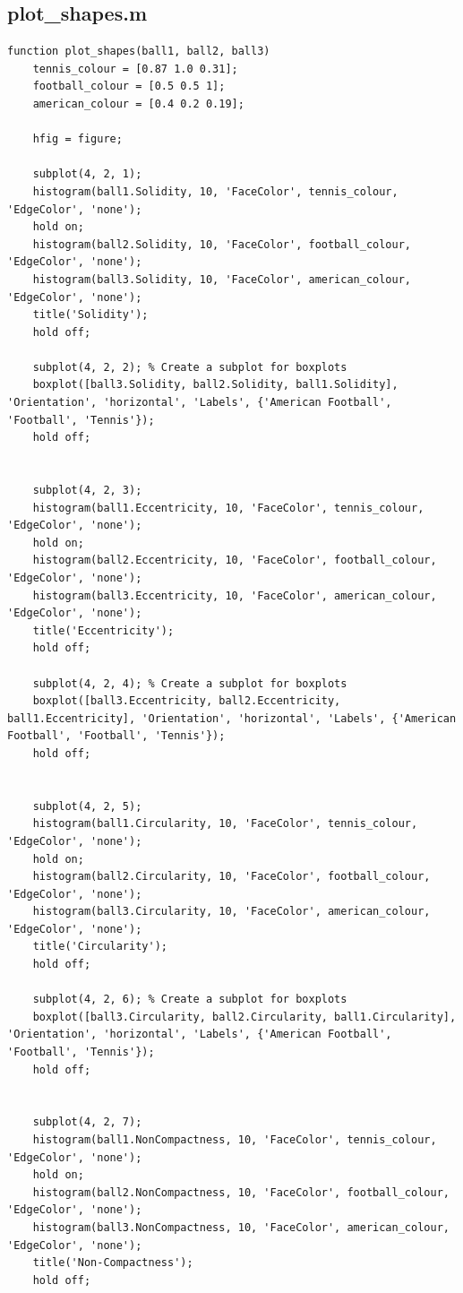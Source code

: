 \documentclass[conference]{IEEEtran}
\begin{document}
        \subsection{plot\_shapes.m}
            \begin{lstlisting}[style=Matlab-editor, basicstyle=\scriptsize]
function plot_shapes(ball1, ball2, ball3)
    tennis_colour = [0.87 1.0 0.31];
    football_colour = [0.5 0.5 1];
    american_colour = [0.4 0.2 0.19];

    hfig = figure;

    subplot(4, 2, 1);
    histogram(ball1.Solidity, 10, 'FaceColor', tennis_colour, 'EdgeColor', 'none');
    hold on;
    histogram(ball2.Solidity, 10, 'FaceColor', football_colour, 'EdgeColor', 'none');
    histogram(ball3.Solidity, 10, 'FaceColor', american_colour, 'EdgeColor', 'none');
    title('Solidity');
    hold off;

    subplot(4, 2, 2); % Create a subplot for boxplots
    boxplot([ball3.Solidity, ball2.Solidity, ball1.Solidity], 'Orientation', 'horizontal', 'Labels', {'American Football', 'Football', 'Tennis'});
    hold off;


    subplot(4, 2, 3);
    histogram(ball1.Eccentricity, 10, 'FaceColor', tennis_colour, 'EdgeColor', 'none');
    hold on;
    histogram(ball2.Eccentricity, 10, 'FaceColor', football_colour, 'EdgeColor', 'none');
    histogram(ball3.Eccentricity, 10, 'FaceColor', american_colour, 'EdgeColor', 'none');
    title('Eccentricity');
    hold off;

    subplot(4, 2, 4); % Create a subplot for boxplots
    boxplot([ball3.Eccentricity, ball2.Eccentricity, ball1.Eccentricity], 'Orientation', 'horizontal', 'Labels', {'American Football', 'Football', 'Tennis'});
    hold off;
    

    subplot(4, 2, 5);
    histogram(ball1.Circularity, 10, 'FaceColor', tennis_colour, 'EdgeColor', 'none');
    hold on;
    histogram(ball2.Circularity, 10, 'FaceColor', football_colour, 'EdgeColor', 'none');
    histogram(ball3.Circularity, 10, 'FaceColor', american_colour, 'EdgeColor', 'none');
    title('Circularity');
    hold off;

    subplot(4, 2, 6); % Create a subplot for boxplots
    boxplot([ball3.Circularity, ball2.Circularity, ball1.Circularity], 'Orientation', 'horizontal', 'Labels', {'American Football', 'Football', 'Tennis'});
    hold off;
    

    subplot(4, 2, 7);
    histogram(ball1.NonCompactness, 10, 'FaceColor', tennis_colour, 'EdgeColor', 'none');
    hold on;
    histogram(ball2.NonCompactness, 10, 'FaceColor', football_colour, 'EdgeColor', 'none');
    histogram(ball3.NonCompactness, 10, 'FaceColor', american_colour, 'EdgeColor', 'none');
    title('Non-Compactness');
    hold off;


\end{lstlisting}
\end{document}

